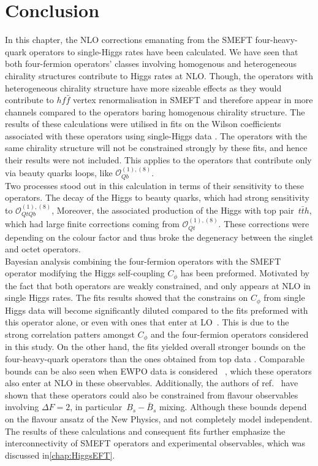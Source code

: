 \section{Conclusion \label{sec:conclusion4tops}}
In this chapter, the NLO corrections emanating from the SMEFT four-heavy-quark operators to single-Higgs rates have been calculated. We have seen that both four-fermion operators' classes involving homogenous and heterogeneous chirality structures contribute to Higgs rates at NLO. Though, the operators with heterogeneous chirality structure have more sizeable effects as they would contribute to $h f\bar f$ vertex renormalisation in SMEFT and therefore appear in more channels compared to the operators baring  homogenous chirality structure. The results of these calculations were utilised in fits on the Wilson coefficients associated with these operators using single-Higgs data . The operators with the same chirality structure will not be constrained strongly by these fits, and hence their results were not included. This applies to the operators that contribute only via beauty quarks loops, like $\mathcal{O}_{Qb}^{(1),(8)}$. \\ Two processes stood out in this calculation in terms of their sensitivity to these operators. The decay of the Higgs to beauty quarks, which had strong sensitivity to $\mathcal{O}_{QtQb}^{(1),(8)}$, Moreover, the associated production of the Higgs with top pair~$t \bar th$, which had large finite corrections coming from $\mathcal{O}_{Qt}^{(1),(8)}$. These corrections were depending on the colour factor and thus broke the degeneracy between the singlet and octet operators. \\
Bayesian analysis combining the four-fermion operators with the SMEFT operator modifying the Higgs self-coupling $C_\phi$ has been preformed. Motivated by the fact that both operators are weakly constrained, and only appears at NLO in single Higgs rates. The fits results showed that the constrains on $C_\phi$ from single Higgs data will become significantly diluted compared to the fits preformed with this operator alone, or even with ones that enter at LO~\cite{Gorbahn:2016uoy, Degrassi:2016wml, Bizon:2016wgr, Maltoni:2017ims, Degrassi:2021uik}. This is due to the strong correlation patters amongst $C_\phi$ and the four-fermion operators considered in this study. On the other hand, the fits yielded overall stronger bounds on the four-heavy-quark operators than the ones obtained from top data \cite{Ethier:2021bye, Hartland:2019bjb}. Comparable bounds can be also seen when EWPO data is considered ~\cite{Dawson:2022bxd}, which these operators also enter at NLO in these observables. Additionally, the authors of ref.~\cite{Silvestrini:2018dos} have shown that these operators could also be constrained from flavour observables involving $\Delta F=2$, in particular~$B_s -\bar{B}_s$ mixing. Although these bounds depend on the flavour ansatz of the New Physics, and not completely model independent. \\ The results of these calculations and consequent fits further emphasize the interconnectivity of SMEFT operators and experimental observables, which was discussed in\autoref{chap:HiggsEFT}. \\
